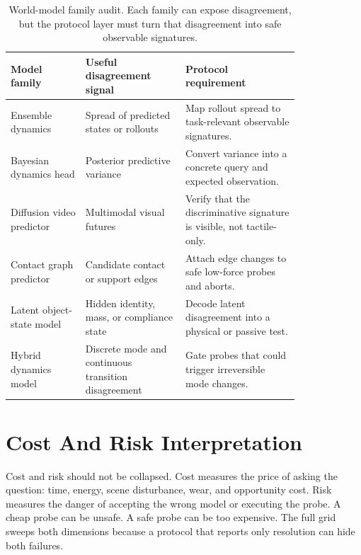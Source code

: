 \documentclass{article}
\begin{document}
\begin{table}[p]
\centering
\small
\begin{tabular}{p{0.21\linewidth}p{0.28\linewidth}p{0.32\linewidth}}
\toprule
Model family & Useful disagreement signal & Protocol requirement \\
\midrule
Ensemble dynamics & Spread of predicted states or rollouts & Map rollout spread to task-relevant observable signatures. \\
Bayesian dynamics head & Posterior predictive variance & Convert variance into a concrete query and expected observation. \\
Diffusion video predictor & Multimodal visual futures & Verify that the discriminative signature is visible, not tactile-only. \\
Contact graph predictor & Candidate contact or support edges & Attach edge changes to safe low-force probes and aborts. \\
Latent object-state model & Hidden identity, mass, or compliance state & Decode latent disagreement into a physical or passive test. \\
Hybrid dynamics model & Discrete mode and continuous transition disagreement & Gate probes that could trigger irreversible mode changes. \\
\bottomrule
\end{tabular}
\caption{World-model family audit. Each family can expose disagreement, but the protocol layer must turn that disagreement into safe observable signatures.}
\label{tab:model_family_audit}
\end{table}

\section{Cost And Risk Interpretation}

Cost and risk should not be collapsed. Cost measures the price of asking the question: time, energy, scene disturbance, wear, and opportunity cost. Risk measures the danger of accepting the wrong model or executing the probe. A cheap probe can be unsafe. A safe probe can be too expensive. The full grid sweeps both dimensions because a protocol that reports only resolution can hide both failures.
\end{document}
